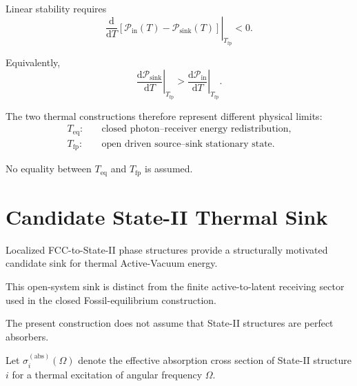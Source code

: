 Linear stability requires
\begin{equation}
    \left.
    \frac{
        \mathrm d
    }{
        \mathrm dT
    }
    \left[
        \mathcal P_{\mathrm{in}}(T)
        -
        \mathcal P_{\mathrm{sink}}(T)
    \right]
    \right|_{T_{\mathrm{fp}}}
    <
    0.
    \label{eq:AT_fixed_point_stability}
\end{equation}

Equivalently,
\begin{equation}
    \left.
    \frac{
        \mathrm d\mathcal P_{\mathrm{sink}}
    }{
        \mathrm dT
    }
    \right|_{T_{\mathrm{fp}}}
    >
    \left.
    \frac{
        \mathrm d\mathcal P_{\mathrm{in}}
    }{
        \mathrm dT
    }
    \right|_{T_{\mathrm{fp}}}.
    \label{eq:AT_sink_slope_condition}
\end{equation}

The two thermal constructions therefore represent different physical limits:
\begin{equation}
    \begin{aligned}
        T_{\mathrm{eq}}:
        &\quad
        \text{closed photon--receiver energy redistribution},
        \\
        T_{\mathrm{fp}}:
        &\quad
        \text{open driven source--sink stationary state}.
    \end{aligned}
    \label{eq:AT_equilibrium_fixed_point_distinction}
\end{equation}

No equality between
\(T_{\mathrm{eq}}\)
and
\(T_{\mathrm{fp}}\)
is assumed.


\section{Candidate State-II Thermal Sink}

Localized FCC-to-State-II phase structures provide a structurally motivated
candidate sink for thermal Active-Vacuum energy.

This open-system sink is distinct from the finite active-to-latent receiving
sector used in the closed Fossil-equilibrium construction.

The present construction does not assume that State-II structures are perfect
absorbers.

Let
\(\sigma_i^{(\mathrm{abs})}(\Omega)\)
denote the effective absorption cross section of State-II structure \(i\) for
a thermal excitation of angular frequency
\(\Omega\).

